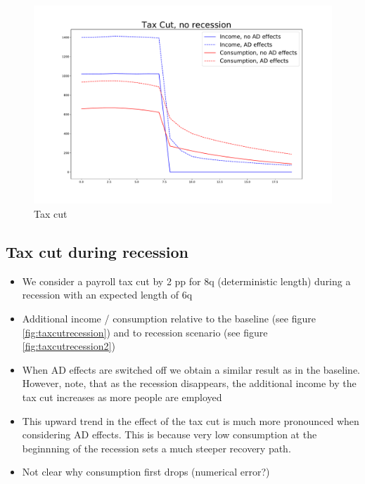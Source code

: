 \documentclass[]{article}
\begin{document}
\begin{figure} 
	\begin{centering}
		\includegraphics[width=\linewidth]{../50kSample_BaseCal/tax_cut.pdf}
		\caption{Tax cut}
		\label{fig:taxcut}
	\end{centering}
\end{figure}

\FloatBarrier
\subsection{Tax cut during recession}

\begin{itemize}
	\item We consider a payroll tax cut by 2 pp for 8q (deterministic length) during a recession with an expected length of 6q 
	\item Additional income / consumption relative to the baseline (see figure \ref{fig:taxcutrecession}) and to recession scenario (see figure \ref{fig:taxcutrecession2})
	\item When AD effects are switched off we obtain a similar result as in the baseline. However, note, that as the recession disappears, the additional income by the tax cut increases as more people are employed
	\item This upward trend in the effect of the tax cut is much more pronounced when considering AD effects. This is because very low consumption at the beginnning of the recession sets a much steeper recovery path.
	\item Not clear why consumption first drops (numerical error?)
\end{itemize}
\end{document}
